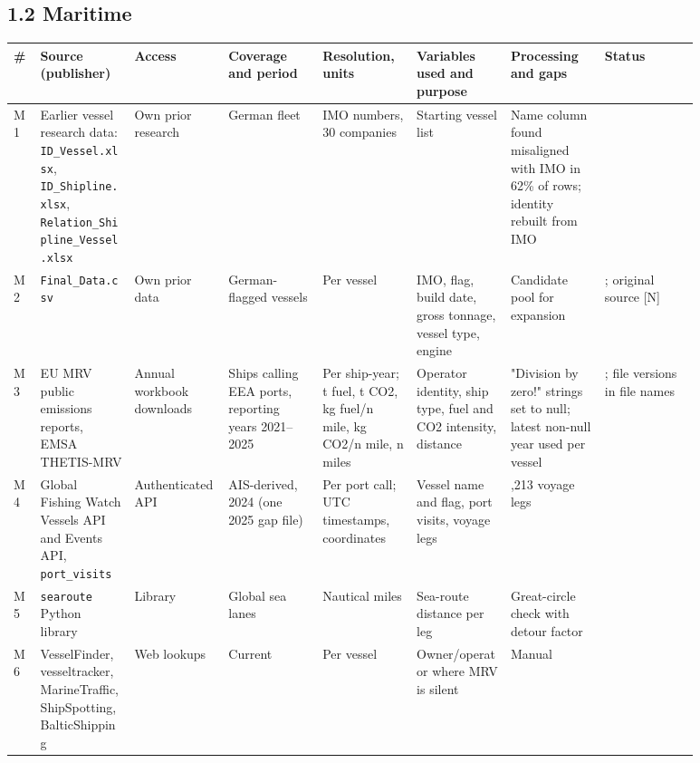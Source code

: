 \documentclass[11pt,a4paper]{article}
\begin{document}
\subsection*{1.2 Maritime}

{\footnotesize\setlength{\tabcolsep}{3pt}
\begin{longtable}{>{\raggedright\arraybackslash}p{0.028\linewidth}>{\raggedright\arraybackslash}p{0.122\linewidth}>{\raggedright\arraybackslash}p{0.122\linewidth}>{\raggedright\arraybackslash}p{0.122\linewidth}>{\raggedright\arraybackslash}p{0.122\linewidth}>{\raggedright\arraybackslash}p{0.122\linewidth}>{\raggedright\arraybackslash}p{0.122\linewidth}>{\raggedright\arraybackslash}p{0.122\linewidth}}
\toprule
\textbf{\#} & \textbf{Source (publisher)} & \textbf{Access} & \textbf{Coverage and period} & \textbf{Resolution, units} & \textbf{Variables used and purpose} & \textbf{Processing and gaps} & \textbf{Status} \tabularnewline
\midrule
\endhead
M1 & Earlier vessel research data: \texttt{ID\_\allowbreak{}Vessel.\allowbreak{}xlsx}, \texttt{ID\_\allowbreak{}Shipline.\allowbreak{}xlsx}, \texttt{Relation\_\allowbreak{}Shipline\_\allowbreak{}Vessel.\allowbreak{}xlsx} & Own prior research & German fleet & 97 IMO numbers, 30 companies & Starting vessel list & Name column found misaligned with IMO in 62\% of rows; identity rebuilt from IMO & [V] \tabularnewline
M2 & \texttt{Final\_\allowbreak{}Data.\allowbreak{}csv} & Own prior data & 650 German-flagged vessels & Per vessel & IMO, flag, build date, gross tonnage, vessel type, engine & Candidate pool for expansion & [V]; original source [N] \tabularnewline
M3 & EU MRV public emissions reports, EMSA THETIS-MRV \citep{eu2015,emsa} & Annual workbook downloads & Ships calling EEA ports, reporting years 2021–2025 & Per ship-year; t fuel, t CO2, kg fuel/n mile, kg CO2/n mile, n miles & Operator identity, ship type, fuel and CO2 intensity, distance & "Division by zero!" strings set to null; latest non-null year used per vessel & [V]; file versions in file names \tabularnewline
M4 & Global Fishing Watch Vessels API and Events API, \texttt{port\_\allowbreak{}visits} \citep{gfw} & Authenticated API & AIS-derived, 2024 (one 2025 gap file) & Per port call; UTC timestamps, coordinates & Vessel name and flag, port visits, voyage legs & 6,213 voyage legs & [V] \tabularnewline
M5 & \texttt{searoute} Python library \citep{searoute} & Library & Global sea lanes & Nautical miles & Sea-route distance per leg & Great-circle check with detour factor & [V] \tabularnewline
M6 & VesselFinder, vesseltracker, MarineTraffic, ShipSpotting, BalticShipping \citep{vesselfinder,vesseltracker,marinetraffic,shipspotting,balticshipping} & Web lookups & Current & Per vessel & Owner/operator where MRV is silent & Manual & [V] \tabularnewline

\end{longtable}}
\end{document}
